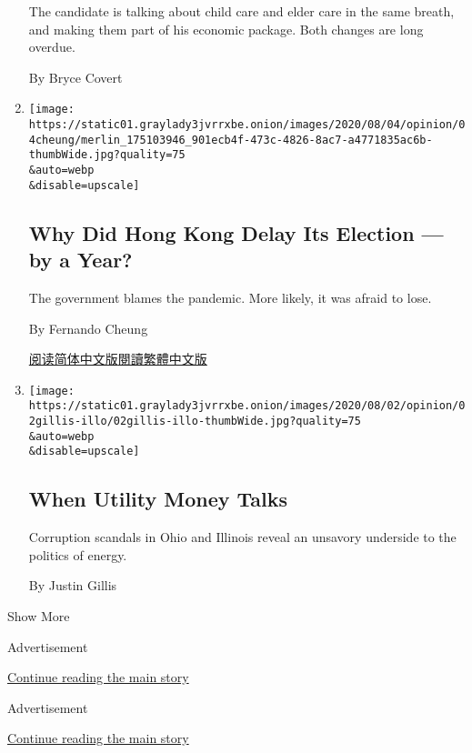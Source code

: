\begin{enumerate}
  The candidate is talking about child care and elder care in the same
  breath, and making them part of his economic package. Both changes are
  long overdue.

  By Bryce Covert
\item
  \href{/2020/08/02/opinion/hong-kong-election-china.html}{}

  \texttt{[image: https://static01.graylady3jvrrxbe.onion/images/2020/08/04/opinion/04cheung/merlin\_175103946\_901ecb4f-473c-4826-8ac7-a4771835ac6b-thumbWide.jpg?quality=75\\\&auto=webp\\\&disable=upscale]}

  \hypertarget{why-did-hong-kong-delay-its-election--by-a-year}{%
  \subsection{Why Did Hong Kong Delay Its Election --- by a
  Year?}\label{why-did-hong-kong-delay-its-election--by-a-year}}

  The government blames the pandemic. More likely, it was afraid to
  lose.

  By Fernando Cheung

  \href{https://cn.nytimes3xbfgragh.onion/opinion/20200803/hong-kong-election-china/}{阅读简体中文版}\href{https://cn.nytimes3xbfgragh.onion/opinion/20200803/hong-kong-election-china/zh-hant/}{閱讀繁體中文版}
\item
  \href{/2020/08/02/opinion/utility-corruption-energy.html}{}

  \texttt{[image: https://static01.graylady3jvrrxbe.onion/images/2020/08/02/opinion/02gillis-illo/02gillis-illo-thumbWide.jpg?quality=75\\\&auto=webp\\\&disable=upscale]}

  \hypertarget{when-utility-money-talks}{%
  \subsection{When Utility Money Talks}\label{when-utility-money-talks}}

  Corruption scandals in Ohio and Illinois reveal an unsavory underside
  to the politics of energy.

  By Justin Gillis
\end{enumerate}

Show More

Advertisement

\protect\hyperlink{after-mid2}{Continue reading the main story}

Advertisement

\protect\hyperlink{after-mktg}{Continue reading the main story}

